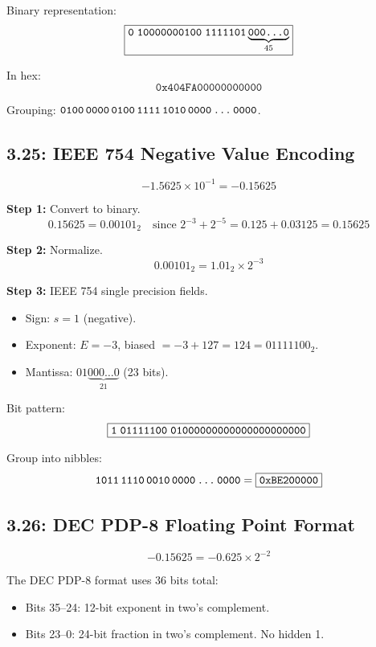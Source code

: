 Binary representation:
\[
  \boxed{\texttt{0\;10000000100\;1111101}\underbrace{\texttt{000\ldots0}}_{45}}
\]

In hex:
\[
  \boxed{\texttt{0x404FA00000000000}}
\]

Grouping: $\texttt{0100\,0000\,0100\,1111\,1010\,0000\,\ldots\,0000}$.

\subsection*{3.25: IEEE 754 Negative Value Encoding}
\hypertarget{sol-3.25}{}

\[
  -1.5625 \times 10^{-1} = -0.15625
\]

\noindent\textbf{Step 1:} Convert to binary.
\[
  0.15625 = 0.00101_2 \quad\text{since } 2^{-3} + 2^{-5} = 0.125 + 0.03125 = 0.15625
\]

\noindent\textbf{Step 2:} Normalize.
\[
  0.00101_2 = 1.01_2 \times 2^{-3}
\]

\noindent\textbf{Step 3:} IEEE 754 single precision fields.
\begin{itemize}
  \item Sign: $s = 1$ (negative).
  \item Exponent: $E = -3$, biased $= -3 + 127 = 124 = 01111100_2$.
  \item Mantissa: $01\underbrace{000\ldots0}_{21}$ (23 bits).
\end{itemize}

Bit pattern:
\[
  \boxed{\texttt{1\;01111100\;01000000000000000000000}}
\]

Group into nibbles:
\[
  \texttt{1011\,1110\,0010\,0000\,\ldots\,0000} = \boxed{\texttt{0xBE200000}}
\]

\subsection*{3.26: DEC PDP-8 Floating Point Format}
\hypertarget{sol-3.26}{}

\[
  -0.15625 = -0.625 \times 2^{-2}
\]

The DEC PDP-8 format uses 36 bits total:
\begin{itemize}
  \item Bits 35--24: 12-bit exponent in two's complement.
  \item Bits 23--0: 24-bit fraction in two's complement. No hidden 1.
\end{itemize}

